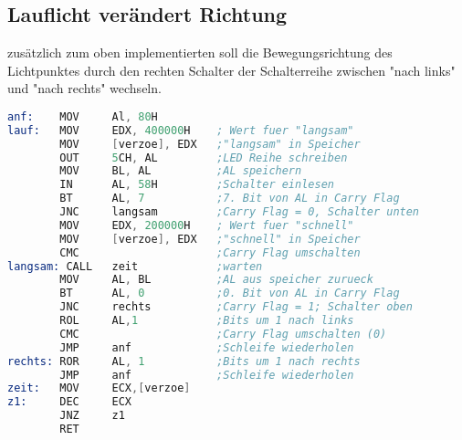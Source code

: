 \documentclass[10pt, a4paper]{report}
\begin{document}
\subsection*{Lauflicht verändert Richtung}
zusätzlich zum oben implementierten soll die Bewegungsrichtung des Lichtpunktes durch den rechten Schalter der Schalterreihe zwischen "nach links" und "nach rechts" wechseln.

\begin{lstlisting}[language=Assembler]
anf:    MOV     Al, 80H
lauf:   MOV     EDX, 400000H    ; Wert fuer "langsam"
        MOV     [verzoe], EDX   ;"langsam" in Speicher
        OUT     5CH, AL         ;LED Reihe schreiben
        MOV     BL, AL          ;AL speichern
        IN      AL, 58H         ;Schalter einlesen
        BT      AL, 7           ;7. Bit von AL in Carry Flag
        JNC     langsam         ;Carry Flag = 0, Schalter unten
        MOV     EDX, 200000H    ; Wert fuer "schnell"
        MOV     [verzoe], EDX   ;"schnell" in Speicher
        CMC                     ;Carry Flag umschalten
langsam: CALL   zeit            ;warten
        MOV     AL, BL          ;AL aus speicher zurueck
        BT      AL, 0           ;0. Bit von AL in Carry Flag
        JNC     rechts          ;Carry Flag = 1; Schalter oben 
        ROL     AL,1            ;Bits um 1 nach links
        CMC                     ;Carry Flag umschalten (0)
        JMP     anf             ;Schleife wiederholen
rechts: ROR     AL, 1           ;Bits um 1 nach rechts
        JMP     anf             ;Schleife wiederholen
zeit:   MOV     ECX,[verzoe]
z1:     DEC     ECX
        JNZ     z1
        RET
\end{lstlisting}
\end{document}
